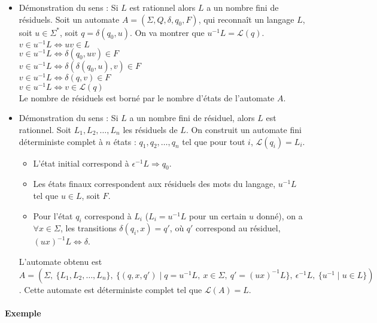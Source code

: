 \begin{itemize}
	\item Démonstration du sens : Si $L$ est rationnel alors $L$ a un nombre fini de résiduels.
	Soit un automate $A=(\Sigma,Q,\delta,q_0,F)$, qui reconnaît un langage $L$, soit $u \in \Sigma^*$, soit $q=\delta(q_0,u)$. On va montrer que $u^{-1}L = \mathcal{L}(q)$.\\
	$v \in u^{-1}L \Leftrightarrow uv \in L$\\
	$v \in u^{-1}L \Leftrightarrow \delta(q_0,uv) \in F$\\
	$v \in u^{-1}L \Leftrightarrow \delta(\delta(q_0,u),v) \in F$\\
	$v \in u^{-1}L \Leftrightarrow \delta(q,v) \in F$\\
	$v \in u^{-1}L \Leftrightarrow v \in \mathcal{L}(q)$\\
	Le nombre de résiduels est borné par le nombre d'états de l'automate $A$.

	\item Démonstration du sens : Si $L$ a un nombre fini de résiduel, alors $L$ est rationnel.
	Soit $L_1,L_2,\ldots,L_n$ les résiduels de $L$. On construit un automate fini déterministe complet à $n$ états : $q_1,q_2,\ldots,q_n$ tel que pour tout $i$, $\mathcal{L}(q_i)=L_i$.
	
	\begin{itemize}
		\item L'état initial correspond à $\epsilon^{-1}L \Rightarrow q_0$.
		\item Les états finaux correspondent aux résiduels des mots du langage, $u^{-1}L$ tel que $u \in L$, soit $F$.
		\item Pour l'état $q_i$ correspond à $L_i$ ($L_i = u^{-1}L$ pour un certain $u$ donné), on a $\forall x \in \Sigma$, les transitions $\delta(q_i,x)=q'$, où $q'$ correspond au résiduel, $(ux)^{-1}L \Leftrightarrow \delta$.
	\end{itemize}

	L'automate obtenu est $A=(\Sigma ,\ \{L_1,L_2,\ldots,L_n\} ,\ \{(q,x,q') \mid q=u^{-1}L,\ x \in \Sigma,\ q'=(ux)^{-1} L\} ,\ \epsilon^{-1}L ,\ \{u^{-1} \mid u \in L\})$.
	Cette automate est déterministe complet tel que $\mathcal{L}(A)=L$.
\end{itemize}



\paragraph{Exemple} %
\label{par:exemple}

